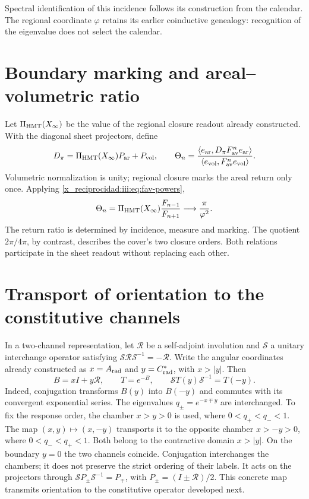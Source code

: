 Spectral identification of this incidence follows its construction
from the calendar. The regional coordinate $\varphi$ retains its earlier coinductive
genealogy: recognition of the eigenvalue does not select the calendar.

\section{Boundary marking and areal--volumetric ratio}

Let $\Pi_{\rm HMT}(X_\infty)$ be the value of the regional closure readout already
constructed. With the diagonal sheet projectors, define
\begin{equation}
 D_\pi=\Pi_{\rm HMT}(X_\infty)P_{\rm ar}+P_{\rm vol},\qquad
 \Theta_n=
 \frac{\langle e_{\rm ar},D_\pi F_{\rm av}^{n}e_{\rm ar}\rangle}
 {\langle e_{\rm vol},F_{\rm av}^{n}e_{\rm vol}\rangle}.
 \label{x_reciprocidad:iii:eq:marked-return}
\end{equation}
Volumetric normalization is unity; regional closure marks the
areal return only once. Applying \eqref{x_reciprocidad:iii:eq:fav-powers},
\begin{equation}
 \Theta_n=\Pi_{\rm HMT}(X_\infty)\frac{F_{n-1}}{F_{n+1}}
 \longrightarrow\frac{\pi}{\varphi^2}.
 \label{x_reciprocidad:iii:eq:av-limit}
\end{equation}
The return ratio is determined by incidence, measure and marking.
The quotient $2\pi/4\pi$, by contrast, describes the cover's two closure orders.
Both relations participate in the sheet readout without replacing each other.

\section{Transport of orientation to the constitutive channels}

In a two-channel representation, let $\mathcal R$ be a self-adjoint
involution and $\mathcal S$ a unitary interchange operator satisfying
$\mathcal S\mathcal R\mathcal S^{-1}=-\mathcal R$. Write the angular coordinates
already constructed as $x=A_{\rm rad}$ and $y=C^*_{\rm rad}$, with $x>|y|$.
Then
\begin{equation}
 B=xI+y\mathcal R,\qquad T=e^{-B},\qquad
 \mathcal ST(y)\mathcal S^{-1}=T(-y).
 \label{x_reciprocidad:iii:eq:channel-conjugation}
\end{equation}
Indeed, conjugation transforms $B(y)$ into $B(-y)$ and commutes with its convergent
exponential series. The eigenvalues $q_\pm=e^{-x\mp y}$ are interchanged.
To fix the response order, the chamber $x>y>0$ is used, where
$0<q_+<q_-<1$. The map $(x,y)\mapsto(x,-y)$ transports it to the
opposite chamber $x>-y>0$, where $0<q_-<q_+<1$. Both belong to the
contractive domain $x>|y|$. On the boundary $y=0$ the two channels coincide.
Conjugation interchanges the chambers; it does not preserve the strict ordering of
their labels. It acts on the projectors through
$\mathcal SP_\pm\mathcal S^{-1}=P_\mp$, with
$P_\pm=(I\pm\mathcal R)/2$.
This concrete map transmits orientation to the constitutive operator
developed next.

